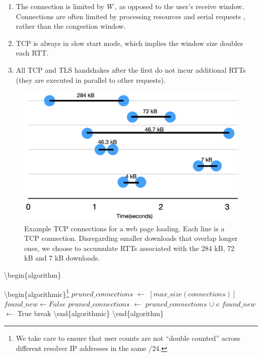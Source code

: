 \documentclass[sigconf,letterpaper,nonacm,10pt,anonymous]{acmart}
\begin{document}
\begin{enumerate}


\item The connection is limited by $\mathnormal{W}$, as opposed to the user's receive window. Connections are often limited by processing resources and serial requests , rather than the congestion window.
\item TCP is always in slow start mode, which implies the window size doubles each RTT. 
\item All TCP and TLS handshakes after the first do not incur additional RTTs (\ie they are executed in parallel to other requests).


\end{enumerate}

\begin{figure}
    \centering
    \includegraphics[width=\linewidth]{figures/multiple_tcp_connections.pdf}
    \caption{Example TCP connections for a web page loading. Each line is a TCP connection. Disregarding smaller downloads that overlap longer ones, we choose to accumulate RTTs associated with the 284 kB, 72 kB and 7 kB downloads.}
    \label{fig:multiple_tcp_connections}
\end{figure}

\iffalse

\textbackslash{}begin\{algorithm\}
\caption{Algorithm for pruning connections over which to accumulate RTTs. Larger connections are considered first, and RTTs for smaller connections are only accumulated if they do not overlap in time with any connection already being considered.}
\label{alg:rtt_pruning_algorithm}
\textbackslash{}begin\{algorithmic\}\footnote{We take care to ensure
  that user counts are not ``double counted'' across different resolver
  IP addresses in the same /24.} \State \(pruned\_connections\)
\(\gets\) \([max\_size(connections)]\) \State \(found\_new \gets False\)
 
\State \(pruned\_connections\) \(\gets\) \(pruned\_connections\)
\(\cup\) c \State \(found\_new\) \(\gets\) True \State break \EndIf
\EndFor
\EndWhile
\textbackslash{}end\{algorithmic\} \textbackslash{}end\{algorithm\}
\end{document}

